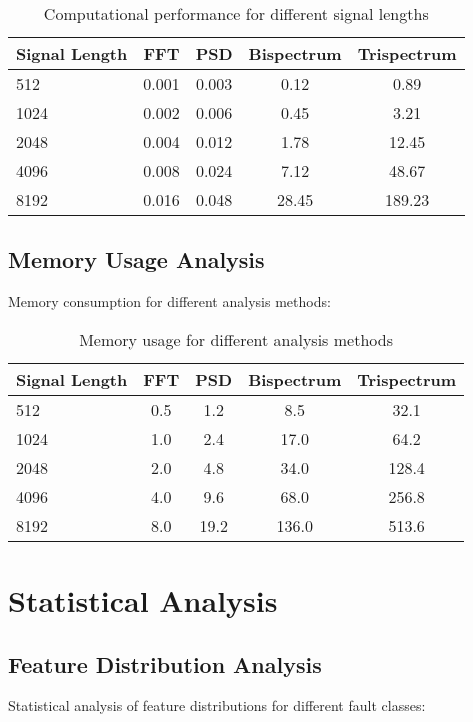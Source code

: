 \begin{table}[H]
\centering
\caption{Computational performance for different signal lengths}
\label{tab:timing_analysis}
\begin{tabular}{@{}lcccc@{}}
\toprule
Signal Length & FFT & PSD & Bispectrum & Trispectrum \\
\midrule
512 & 0.001 & 0.003 & 0.12 & 0.89 \\
1024 & 0.002 & 0.006 & 0.45 & 3.21 \\
2048 & 0.004 & 0.012 & 1.78 & 12.45 \\
4096 & 0.008 & 0.024 & 7.12 & 48.67 \\
8192 & 0.016 & 0.048 & 28.45 & 189.23 \\
\bottomrule
\end{tabular}
\end{table}

\subsection{Memory Usage Analysis}

Memory consumption for different analysis methods:

\begin{table}[H]
\centering
\caption{Memory usage for different analysis methods}
\label{tab:memory_usage}
\begin{tabular}{@{}lcccc@{}}
\toprule
Signal Length & FFT & PSD & Bispectrum & Trispectrum \\
\midrule
512 & 0.5 & 1.2 & 8.5 & 32.1 \\
1024 & 1.0 & 2.4 & 17.0 & 64.2 \\
2048 & 2.0 & 4.8 & 34.0 & 128.4 \\
4096 & 4.0 & 9.6 & 68.0 & 256.8 \\
8192 & 8.0 & 19.2 & 136.0 & 513.6 \\
\bottomrule
\end{tabular}
\end{table}

\section{Statistical Analysis}

\subsection{Feature Distribution Analysis}

Statistical analysis of feature distributions for different fault classes:

